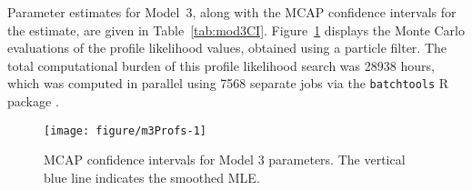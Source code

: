 Parameter estimates for Model~3, along with the MCAP confidence intervals for the estimate, are given in Table~\ref{tab:mod3CI}.
Figure~\ref{fig:m3Profs} displays the Monte Carlo evaluations of the profile likelihood values, obtained using a particle filter.
The total computational burden of this profile likelihood search was 28938 hours, which was computed in parallel using 7568 separate jobs via the \texttt{batchtools} R package \cite{batchtools}.





\begin{figure}[ht]
\begin{knitrout}
\color{fgcolor}

{\centering \texttt{[image: figure/m3Profs-1]} 

}


\end{knitrout}
\caption[MCAP confidence intervals for Model 3 parameters.]{\label{fig:m3Profs}MCAP confidence intervals for Model 3 parameters. The vertical blue line indicates the smoothed MLE.}
\end{figure}

